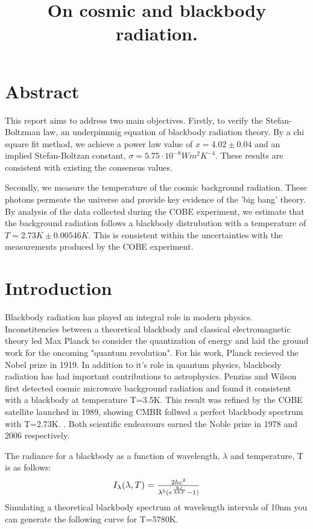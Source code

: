 \documentclass{article}%
\title{On cosmic and blackbody radiation.}%
\begin{document}
%
\normalsize%
\maketitle%
\section{Abstract}%
\label{sec:Abstract}%

This report aims to address two main objectives. Firstly, to verify the Stefan{-}Boltzman law, 
an underpinnnig equation of blackbody radiation theory.
By a chi square fit method, we achieve a power law value of $x=4.02 \pm 0.04$ 
and an implied Stefan-Boltzan constant, $\sigma =5.75 \cdot 10^{-8}Wm^{2}K^{-4} $. 
These results are consistent with existing the consensus values. \cite{Boltzman} \cite{Martin} \par
Secondly, we measure the temperature of the cosmic background radiation. These photons permeate the universe and
provide key evidence of the 'big bang' theory.  By analysis of the data collected during the COBE experiment, 
we estimate that the background radiation follows a blackbody distrubution with a temperature of $T = 2.73K \pm 0.00546K$.
This is consistent within the uncertainties with the measurements produced by the COBE experiment. \cite{Mather}

%
\section{Introduction}%
\label{sec:Introduction}%

Blackbody radiation has played an integral role in modern physics.
Inconstitencies between a theoretical blackbody and classical electromagnetic theory
led Max Planck to consider the quantization of energy and laid the ground work for the oncoming "quantum revolution".\cite{Baggot}
For his work, Planck recieved the Nobel prize in 1919.
In addition to it's role in quantum physics, blackbody radiation has had important contributions to astrophysics.
Penzias and Wilson  first detected cosmic microwave background radiation and found it consistent with a blackbody
at temperature T=3.5K. \cite{Wilson} This result was refined by the COBE satellite launched in 1989, showing CMBR follwed a perfect blackbody spectrum with T=2.73K. \cite{Mather}.
Both scientific endeavours earned the Noble prize in 1978 and 2006 respectively.  


The radiance for a blackbody as a function of wavelength, $\lambda$ and temperature, T is as follows:
\begin{equation}
  \resizebox{.3\hsize}{!}{$I_{\lambda}(\lambda,T) = \frac{2hc^2}{\lambda^5 (e^ \frac{hc}{\lambda kT} - 1)}$}
  \end{equation}
Simulating a theoretical blackbody spectrum at wavelength intervals of 10nm you can generate the following 
curve for T=5780K.
\end{document}
